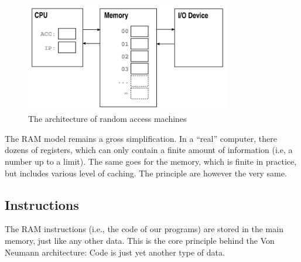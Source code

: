 \documentclass {aldast}
\begin{document}
\begin{figure}[htbp]
  \begin{center}
    \includegraphics[width=0.8\textwidth]{images/ram}
  \end{center}
  \caption{The architecture of random access machines}
  \label{fig:ram}
\end{figure}

The RAM model remains a gross simplification. In a ``real''
computer, there dozens of registers, which can only contain a finite
amount of information (i.e, a number up to a limit). The same goes
for the memory, which is finite in practice, but includes various
level of caching. The principle are however the very same.

\subsection{Instructions}

The RAM instructions (i.e., the code of our programs) are stored in
the main memory, just like any other data. This is the core principle
behind the Von Neumann architecture: Code is just yet another type of
data.
\end{document}
